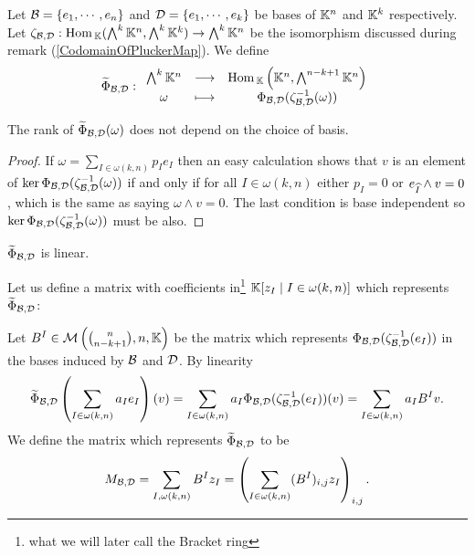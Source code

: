 \begin{definition}
Let $\mathcal{B}=\left\{{e_1,\cdots, e_n}\right\}$ and $\mathcal{D}=\left\{{e_1,\cdots, e_k}\right\}$ be bases of $\mathbb{K}^n$ and $\mathbb{K}^k$ respectively. Let $\zeta_{\mathcal{B},\mathcal{D}}:\mathrm{Hom}\,_{\mathbb{K}}(\bigwedge^k\mathbb{K}^n,\bigwedge^k\mathbb{K}^k)\to\bigwedge^k\mathbb{K}^n$ be the isomorphism discussed during remark (\ref{CodomainOfPluckerMap}). We define
\[\widetilde{\Phi}_{\mathcal{B},\mathcal{D}}:\begin{array}{ccc} {\bigwedge^k\mathbb{K}^n} & \longrightarrow & { \mathrm{Hom}\,_{\mathbb{K}}\left({\mathbb{K}^n,\bigwedge^{n-k+1}\mathbb{K}^n}\right)}\\ {\omega} & \longmapsto & {\Phi_{\mathcal{B},\mathcal{D}}(\zeta_{\mathcal{B},\mathcal{D}}^{-1}(\omega))} \end{array}\]
\end{definition}

\begin{proposition}
The rank of $\widetilde{\Phi}_{\mathcal{B},\mathcal{D}}(\omega)$ does not depend on the choice of basis.
\end{proposition}
\begin{proof}
If $\omega=\sum_{I\in\omega(k,n)}p_Ie_I$ then an easy calculation shows that $v$ is an element of $\ker \Phi_{\mathcal{B},\mathcal{D}}(\zeta_{\mathcal{B},\mathcal{D}}^{-1}(\omega))$ if and only if for all $I\in \omega(k,n)$ either $p_I=0$ or $e_{\widehat{I}}\wedge v=0$, which is the same as saying $\omega\wedge v= 0$. The last condition is base independent so $\ker \Phi_{\mathcal{B},\mathcal{D}}(\zeta_{\mathcal{B},\mathcal{D}}^{-1}(\omega))$ must be also.
\end{proof}

\begin{remark}
$\widetilde{\Phi}_{\mathcal{B},\mathcal{D}}$ is linear.
\end{remark}



\noindent
Let us define a matrix with coefficients in\footnote{what we will later call the Bracket ring} $\mathbb{K}[z_I\mid I\in\omega(k,n)]$ which represents $\widetilde{\Phi}_{\mathcal{B},\mathcal{D}}$:\medskip

Let $B^I\in \mathcal{M}\left({\binom{n}{n-k+1},n,\mathbb{K}}\right)$ be the matrix which represents $\Phi_{\mathcal{B},\mathcal{D}}(\zeta_{\mathcal{B},\mathcal{D}}^{-1}(e_I))$ in the bases induced by $\mathcal{B}$ and $\mathcal{D}$. By linearity
\[\widetilde{\Phi}_{\mathcal{B},\mathcal{D}}\left({\sum_{I\in \omega(k,n)}a_I e_I}\right)(v)=\sum_{I\in \omega(k,n)}a_I \Phi_{\mathcal{B},\mathcal{D}}(\zeta_{\mathcal{B},\mathcal{D}}^{-1}(e_I))(v)=\sum_{I\in \omega(k,n)}a_I B^I v.\]
We define the matrix which represents $\widetilde{\Phi}_{\mathcal{B},\mathcal{D}}$ to be
\[M_{\mathcal{B},\mathcal{D}}=\sum_{I,\omega(k,n)}B^I z_I=\left({\sum_{I\in\omega(k,n)}(B^I)_{i,j}z_I}\right)_{i,j}.\]


